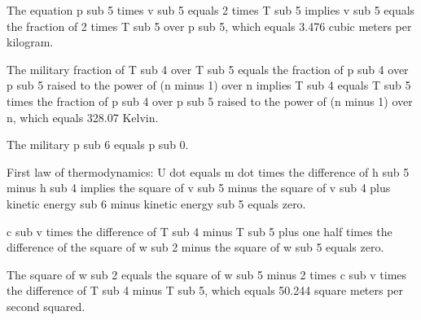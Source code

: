 The equation p sub 5 times v sub 5 equals 2 times T sub 5 implies v sub 5 equals the fraction of 2 times T sub 5 over p sub 5, which equals 3.476 cubic meters per kilogram.

The military fraction of T sub 4 over T sub 5 equals the fraction of p sub 4 over p sub 5 raised to the power of (n minus 1) over n implies T sub 4 equals T sub 5 times the fraction of p sub 4 over p sub 5 raised to the power of (n minus 1) over n, which equals 328.07 Kelvin.

The military p sub 6 equals p sub 0.

First law of thermodynamics: U dot equals m dot times the difference of h sub 5 minus h sub 4 implies the square of v sub 5 minus the square of v sub 4 plus kinetic energy sub 6 minus kinetic energy sub 5 equals zero.

c sub v times the difference of T sub 4 minus T sub 5 plus one half times the difference of the square of w sub 2 minus the square of w sub 5 equals zero.

The square of w sub 2 equals the square of w sub 5 minus 2 times c sub v times the difference of T sub 4 minus T sub 5, which equals 50.244 square meters per second squared.